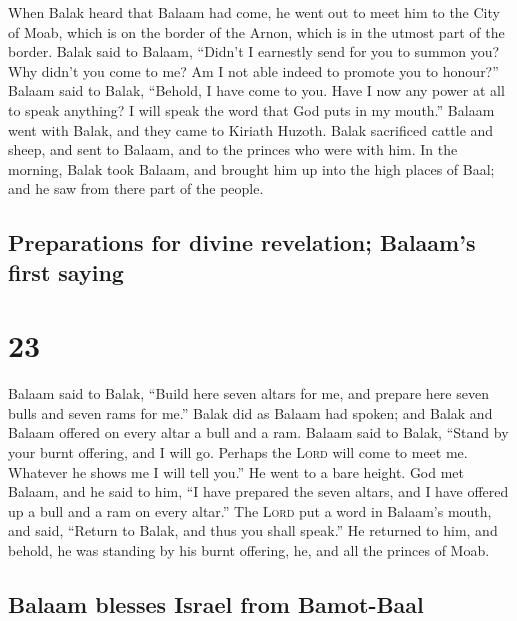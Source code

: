  When Balak heard that Balaam had come, he went out to
meet him to the City of Moab, which is on the border of the Arnon, which
is in the utmost part of the border.  Balak said to
Balaam, ``Didn't I earnestly send for you to summon you? Why didn't you
come to me? Am I not able indeed to promote you to honour?''
 Balaam said to Balak, ``Behold, I have come to you. Have
I now any power at all to speak anything? I will speak the word that God
puts in my mouth.''  Balaam went with Balak, and they
came to Kiriath Huzoth.  Balak sacrificed cattle and
sheep, and sent to Balaam, and to the princes who were with him.
 In the morning, Balak took Balaam, and brought him up
into the high places of Baal; and he saw from there part of the people.

\hypertarget{preparations-for-divine-revelation-balaams-first-saying}{%
\subsection{Preparations for divine revelation; Balaam's first
saying}\label{preparations-for-divine-revelation-balaams-first-saying}}

\hypertarget{section-22}{%
\section{23}\label{section-22}}

 Balaam said to Balak, ``Build here seven altars for me,
and prepare here seven bulls and seven rams for me.'' 
Balak did as Balaam had spoken; and Balak and Balaam offered on every
altar a bull and a ram.  Balaam said to Balak, ``Stand by
your burnt offering, and I will go. Perhaps the \textsc{Lord} will come
to meet me. Whatever he shows me I will tell you.'' He went to a bare
height.  God met Balaam, and he said to him, ``I have
prepared the seven altars, and I have offered up a bull and a ram on
every altar.''  The \textsc{Lord} put a word in Balaam's
mouth, and said, ``Return to Balak, and thus you shall speak.''
 He returned to him, and behold, he was standing by his
burnt offering, he, and all the princes of Moab.

\hypertarget{balaam-blesses-israel-from-bamot-baal}{%
\subsection{Balaam blesses Israel from
Bamot-Baal}\label{balaam-blesses-israel-from-bamot-baal}}

